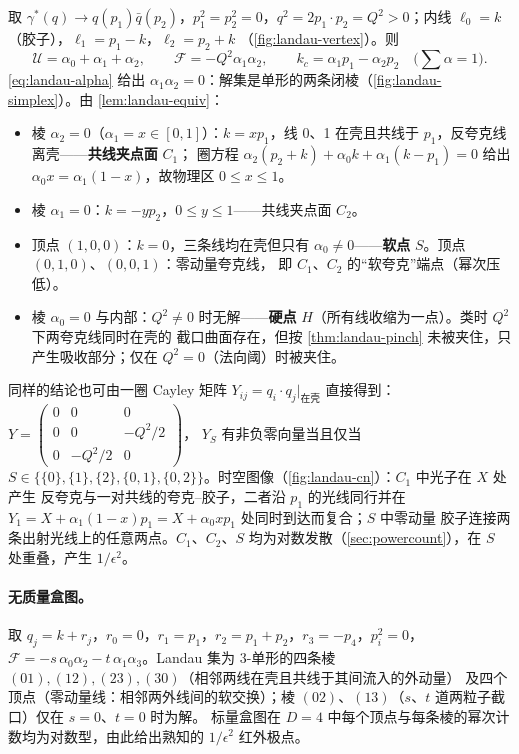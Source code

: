 取 $\gamma^*(q)\to q(p_1)\bar q(p_2)$，$p_1^2=p_2^2=0$，$q^2=2p_1\cdot p_2=Q^2>0$；内线 $\ell_0=k$（胶子），$\ell_1=p_1-k$，$\ell_2=p_2+k$
（\cref{fig:landau-vertex}）。则
\begin{equation}\label{eq:landau-vertexF}
\mathcal U=\alpha_0+\alpha_1+\alpha_2,\qquad \mathcal F=-Q^2\alpha_1\alpha_2,\qquad k_c=\alpha_1p_1-\alpha_2p_2\quad\Big(\sum\alpha=1\Big).
\end{equation}
\cref{eq:landau-alpha} 给出 $\alpha_1\alpha_2=0$：解集是单形的两条闭棱（\cref{fig:landau-simplex}）。由 \cref{lem:landau-equiv}：
\begin{itemize}[leftmargin=2em]
\item 棱 $\alpha_2=0$（$\alpha_1=x\in[0,1]$）：$k=xp_1$，线 0、1 在壳且共线于 $p_1$，反夸克线离壳——\textbf{共线夹点面} $C_1$；
  圈方程 $\alpha_2(p_2+k)+\alpha_0k+\alpha_1(k-p_1)=0$ 给出 $\alpha_0x=\alpha_1(1-x)$，故物理区 $0\le x\le1$。
\item 棱 $\alpha_1=0$：$k=-yp_2$，$0\le y\le1$——共线夹点面 $C_2$。
\item 顶点 $(1,0,0)$：$k=0$，三条线均在壳但只有 $\alpha_0\ne0$——\textbf{软点} $S$。顶点 $(0,1,0)$、$(0,0,1)$：零动量夸克线，
  即 $C_1$、$C_2$ 的“软夸克”端点（幂次压低）。
\item 棱 $\alpha_0=0$ 与内部：$Q^2\ne0$ 时无解——\textbf{硬点} $H$（所有线收缩为一点）。类时 $Q^2$ 下两夸克线同时在壳的
  截口曲面存在，但按 \cref{thm:landau-pinch} 未被夹住，只产生吸收部分；仅在 $Q^2=0$（法向阈）时被夹住。
\end{itemize}
同样的结论也可由一圈 Cayley 矩阵 $Y_{ij}=q_i\cdot q_j|_{\text{在壳}}$ 直接得到：$Y=\begin{pmatrix}0&0&0\\0&0&-Q^2/2\\0&-Q^2/2&0\end{pmatrix}$，
$Y_S$ 有非负零向量当且仅当 $S\in\{\{0\},\{1\},\{2\},\{0,1\},\{0,2\}\}$。时空图像（\cref{fig:landau-cn}）：$C_1$ 中光子在 $X$ 处产生
反夸克与一对共线的夸克–胶子，二者沿 $p_1$ 的光线同行并在 $Y_1=X+\alpha_1(1-x)p_1=X+\alpha_0xp_1$ 处同时到达而复合；$S$ 中零动量
胶子连接两条出射光线上的任意两点。$C_1$、$C_2$、$S$ 均为对数发散（\cref{sec:powercount}），在 $S$ 处重叠，产生 $1/\epsilon^2$。

\paragraph{无质量盒图。} 取 $q_j=k+r_j$，$r_0=0$，$r_1=p_1$，$r_2=p_1+p_2$，$r_3=-p_4$，$p_i^2=0$，
$\mathcal F=-s\,\alpha_0\alpha_2-t\,\alpha_1\alpha_3$。Landau 集为 3-单形的四条棱 $(01),(12),(23),(30)$（相邻两线在壳且共线于其间流入的外动量）
及四个顶点（零动量线：相邻两外线间的软交换）；棱 $(02)$、$(13)$（$s$、$t$ 道两粒子截口）仅在 $s=0$、$t=0$ 时为解。
标量盒图在 $D=4$ 中每个顶点与每条棱的幂次计数均为对数型，由此给出熟知的 $1/\epsilon^2$ 红外极点。

